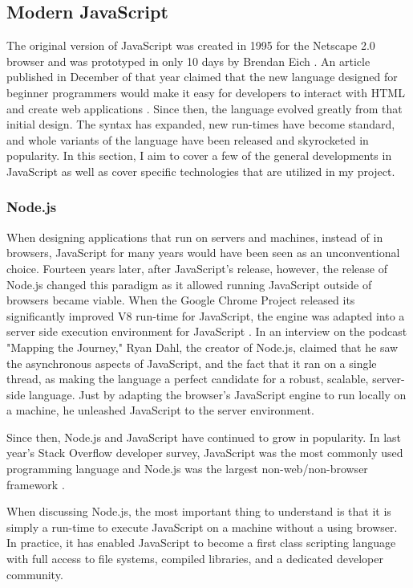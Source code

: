 \subsection{Modern JavaScript}

The original version of JavaScript was created in 1995 for the Netscape 2.0 browser and was prototyped in only 10 days by Brendan Eich \cite{redhatinc.CreatingJavaScript}.  An article published in December of that year claimed that the new language designed for beginner programmers would make it easy for developers to interact with HTML and create web applications \cite{bucholtzNewLanguageAims1995}.  Since then, the language evolved greatly from that initial design.  The syntax has expanded, new run-times have become standard, and whole variants of the language have been released and skyrocketed in popularity.  In this section, I aim to cover a few of the general developments in JavaScript as well as cover specific technologies that are utilized in my project.

\subsubsection{Node.js}
When designing applications that run on servers and machines, instead of in browsers, JavaScript for many years would have been seen as an unconventional choice.  Fourteen years later, after JavaScript's release, however, the release of Node.js changed this paradigm as it allowed running JavaScript outside of browsers became viable. When the Google Chrome Project released its significantly improved V8 run-time for JavaScript, the engine was adapted into a server side execution environment for JavaScript \cite{pramodEpisodeInterviewRyan}.  In an interview on the podcast "Mapping the Journey," Ryan Dahl, the creator of Node.js, claimed that he saw the asynchronous aspects of JavaScript, and the fact that it ran on a single thread, as making the language a perfect candidate for a robust, scalable, server-side language.  Just by adapting the browser's JavaScript engine to run locally on a machine, he unleashed JavaScript to the server environment.

Since then, Node.js and JavaScript have continued to grow in popularity. In last year's Stack Overflow developer survey, JavaScript was the most commonly used programming language and Node.js was the largest non-web/non-browser framework \cite{stackoverflowStackOverflowDeveloper}.

When discussing Node.js, the most important thing to understand is that it is simply a run-time to execute JavaScript on a machine without a using browser.  In practice, it has enabled JavaScript to become a first class scripting language with full access to file systems, compiled libraries, and a dedicated developer community.

